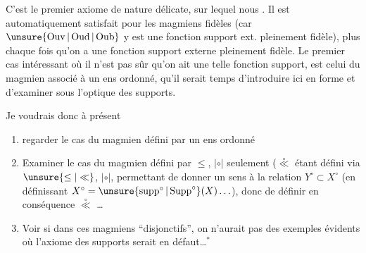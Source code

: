 \clearpage
{}

C'est le premier axiome de nature délicate, sur lequel nous . Il est automatiquement satisfait pour les magmiens fidèles (car $\unsure{\operatorname{Ouv}|\operatorname{Oud}|\operatorname{Oub}}$ y est une fonction support ext. pleinement fidèle), plus  chaque fois qu'on a une fonction support externe pleinement fidèle. Le premier cas intéressant où il n'est pas sûr qu'on ait une telle fonction support, est celui du magmien associé à un ens ordonné, qu'il serait temps d'introduire ici en forme et d'examiner sous l'optique des supports.

Je voudrais donc à présent
\begin{enumerate}[label=\arabic*\textsuperscript{o}),leftmargin=*]
\item regarder le cas du magmien  défini par un ens ordonné
\item Examiner le cas du magmien défini par $\leq$, $|\circ|$ seulement ($\overset{\circ}{\ll}$ étant défini via $\unsure{\leq|\ll}$, $|\circ|$,   permettant de donner un sens à la relation $Y^{\circ}\subset X^{\circ}$ (en définissant $X^{\circ}=\unsure{\operatorname{supp}^{\circ}|\operatorname{Supp}^{\circ}}(X)\ldots$), donc de définir en conséquence $\overset{\circ}{\ll}$ \ldots
\item Voir si dans ces magmiens ``disjonctifs'', on n'aurait pas des exemples évidents où l'axiome des supports serait en défaut\ldots$^*$
\end{enumerate}

